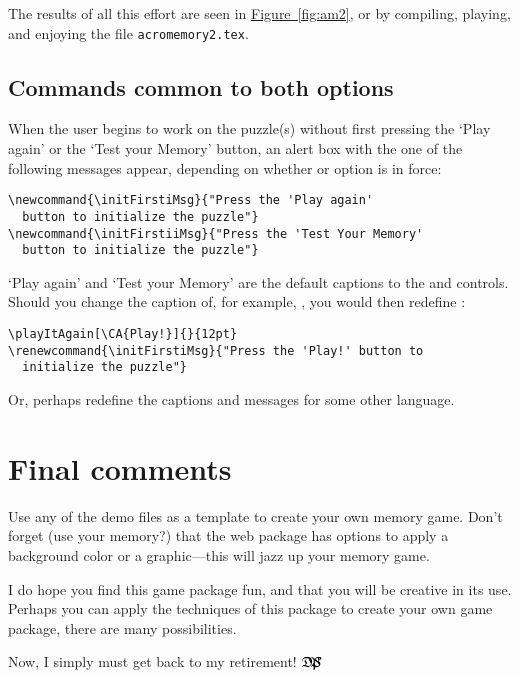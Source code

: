 \documentclass{article}
\edef\amtIndent{\the\parindent}
\def\dps{$\hbox{$\mathfrak D$\kern-.3em\hbox{$\mathfrak P$}%
   \kern-.6em \hbox{$\mathcal S$}}$}
\begin{document}
\newtopic\noindent
The results of all this effort are seen in \hyperref[fig:am2]{Figure~\ref*{fig:am2}},
or by compiling, playing, and enjoying the file \texttt{acromemory2.tex}.


\subsection{Commands common to both options}

When the user begins to work on the puzzle(s) without first pressing the
`\textsf{Play again}' or the `\textsf{Test your Memory}' button, an alert box
with the one of the following messages appear, depending on whether
 or  option is in force:
\begin{Verbatim}
\newcommand{\initFirstiMsg}{"Press the 'Play again'
  button to initialize the puzzle"}
\newcommand{\initFirstiiMsg}{"Press the 'Test Your Memory'
  button to initialize the puzzle"}
\end{Verbatim}
`\textsf{Play again}' and `\textsf{Test your Memory}' are the default
captions to  the  and  controls. Should you change the
caption of, for example, , you would then redefine :
\begin{Verbatim}[xleftmargin=\amtIndent]
\playItAgain[\CA{Play!}]{}{12pt}
\renewcommand{\initFirstiMsg}{"Press the 'Play!' button to
  initialize the puzzle"}
\end{Verbatim}
Or, perhaps redefine the captions and messages for some other language.



\section{Final comments}

Use any of the demo files as a template to create your own memory
game. Don't forget (use your memory?) that the \textsf{web} package
has options to apply a background color or a graphic---this will
jazz up your memory game.

I do hope you find this game package fun, and that you will be
creative in its use. Perhaps you can apply the techniques of this
package to create your own game package, there are many
possibilities.

\newtopic Now, I simply must get back to my retirement! \dps
\end{document}
